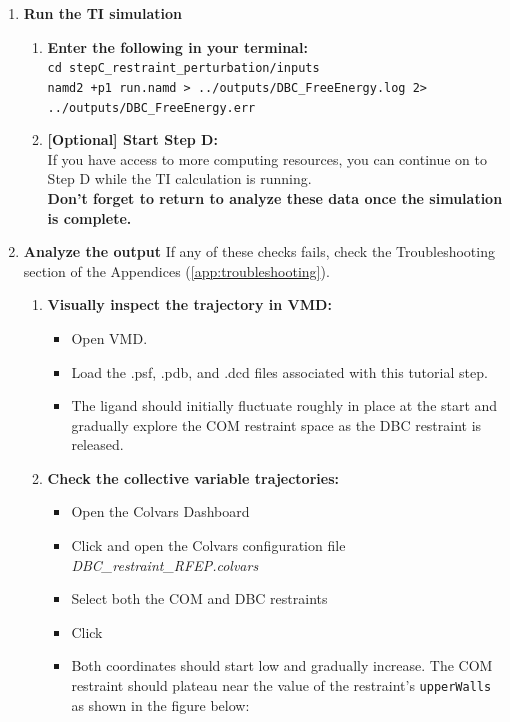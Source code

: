 \documentclass[9pt,tutorial,pubversion]{Styling/livecoms}
\newcommand{\filepath}[1]{\textit{#1}}
\newcommand{\button}[1]{\inlineBox[gray]{\texttt{#1}}}
\newcommand{\textInput}[1]{\texttt{#1}}
\begin{document}
\begin{enumerate}
        \item \textbf{Run the TI simulation} 
        \begin{enumerate}[label=\alph*., ref=\theenumi.\alph*]
            \item \textbf{Enter the following in your terminal:}\\
            \textInput{cd stepC\_restraint\_perturbation/inputs}\\
            \textInput{namd2 +p1 run.namd > ../outputs/DBC\_FreeEnergy.log 2> ../outputs/DBC\_FreeEnergy.err}
            \item \textbf{[Optional] Start Step D:}\\
            If you have access to more computing resources, you can continue on to Step D while the TI calculation is running.\\
            \textbf{Don't forget to return to analyze these data once the simulation is complete.}
        \end{enumerate}
        \item \textbf{Analyze the output} \label{step:analyzeRFEP}
        If any of these checks fails, check the Troubleshooting section of the Appendices (\ref{app:troubleshooting}).
        \begin{enumerate}[label=\alph*., ref=\theenumi.\alph*]
            \item \textbf{Visually inspect the trajectory in VMD:}
            \begin{itemize}
                \item Open VMD.
                \item Load the .psf, .pdb, and .dcd files associated with this tutorial step.
                \item The ligand should initially fluctuate roughly in place at the start and gradually explore the COM restraint space as the DBC restraint is released. 
            \end{itemize}
            \item \label{step:CV_traj} \textbf{Check the collective variable trajectories:}
            \begin{itemize}
                \item Open the Colvars Dashboard
                \item Click \button{Load} and open the Colvars configuration file \filepath{DBC\_restraint\_RFEP.colvars}
                \item Select both the COM and DBC restraints
                \item Click \button{Timeline plot}
                \item Both coordinates should start low and gradually increase. The COM restraint should plateau near the value of the restraint's \textInput{upperWalls} as shown in the figure below:
                

\end{itemize}
\end{enumerate}
\end{enumerate}
\end{document}
